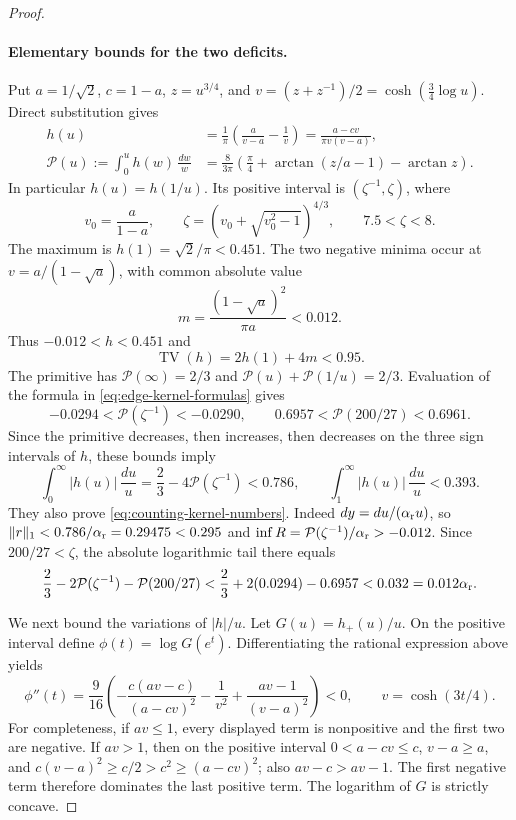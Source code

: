 \begin{proof}
\paragraph{Elementary bounds for the two deficits.}
Put \(a=1/\sqrt2\), \(c=1-a\), \(z=u^{3/4}\), and
\(v=(z+z^{-1})/2=\cosh(\tfrac34\log u)\). Direct substitution gives
\begin{equation}\label{eq:edge-kernel-formulas}
 \begin{aligned}
 h(u)&=\frac1\pi\left(\frac a{v-a}-\frac1v\right)
      =\frac{a-cv}{\pi v(v-a)},\\
 \mathcal P(u):=\int_0^u h(w)\,\frac{dw}{w}
 &=\frac8{3\pi}\left(\frac\pi4+
      \arctan(z/a-1)-\arctan z\right).
 \end{aligned}
\end{equation}
In particular \(h(u)=h(1/u)\). Its positive interval is
\((\zeta^{-1},\zeta)\), where
\[
 v_0=\frac a{1-a},\qquad
 \zeta=(v_0+\sqrt{v_0^2-1})^{4/3},\qquad 7.5<\zeta<8.
\]
The maximum is \(h(1)=\sqrt2/\pi<0.451\). The two negative minima occur at
\(v=a/(1-\sqrt a)\), with common absolute value
\[
 m=\frac{(1-\sqrt a)^2}{\pi a}<0.012.
\]
Thus \(-0.012<h<0.451\) and
\[
 \operatorname{TV}(h)=2h(1)+4m<0.95.
\]
The primitive has \(\mathcal P(\infty)=2/3\) and
\(\mathcal P(u)+\mathcal P(1/u)=2/3\). Evaluation of the formula in
\eqref{eq:edge-kernel-formulas} gives
\[
 -0.0294<\mathcal P(\zeta^{-1})<-0.0290,\qquad
 0.6957<\mathcal P(200/27)<0.6961.
\]
Since the primitive decreases, then increases, then decreases on the three sign intervals of \(h\), these bounds imply
\[
 \int_0^\infty |h(u)|\,\frac{du}{u}
 =\frac23-4\mathcal P(\zeta^{-1})<0.786,\qquad
 \int_1^\infty |h(u)|\,\frac{du}{u}<0.393.
\]
They also prove \eqref{eq:counting-kernel-numbers}. Indeed \(dy=du/(\alpha_{\rm r}u)\), so
\(\|r\|_1<0.786/\alpha_{\rm r}=0.29475<0.295\) and
\(\inf R=\mathcal P(\zeta^{-1})/\alpha_{\rm r}>-0.012\). Since
\(200/27<\zeta\), the absolute logarithmic tail there equals
\[
 \frac23-2\mathcal P(\zeta^{-1})-\mathcal P(200/27)
 <\frac23+2(0.0294)-0.6957<0.032
 =0.012\alpha_{\rm r}.
\]

We next bound the variations of \(|h|/u\). Let \(G(u)=h_+(u)/u\). On the positive interval define
\(\phi(t)=\log G(e^t)\). Differentiating the rational expression above yields
\[
 \phi''(t)=\frac9{16}
 \left(-\frac{c(av-c)}{(a-cv)^2}-\frac1{v^2}
                 +\frac{av-1}{(v-a)^2}\right)<0,
 \qquad v=\cosh(3t/4).
\]
For completeness, if \(av\le1\), every displayed term is nonpositive and the first two are negative. If \(av>1\), then on the positive interval
\(0<a-cv\le c\), \(v-a\ge a\), and
\(c(v-a)^2\ge c/2>c^2\ge(a-cv)^2\); also \(av-c>av-1\).
The first negative term therefore dominates the last positive term.
The logarithm of \(G\) is strictly concave.


\end{proof}
